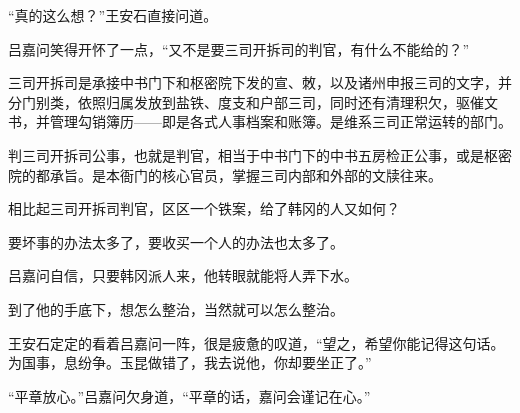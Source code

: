 “真的这么想？”王安石直接问道。

吕嘉问笑得开怀了一点，“又不是要三司开拆司的判官，有什么不能给的？”

三司开拆司是承接中书门下和枢密院下发的宣、敇，以及诸州申报三司的文字，并分门别类，依照归属发放到盐铁、度支和户部三司，同时还有清理积欠，驱催文书，并管理勾销簿历——即是各式人事档案和账簿。是维系三司正常运转的部门。

判三司开拆司公事，也就是判官，相当于中书门下的中书五房检正公事，或是枢密院的都承旨。是本衙门的核心官员，掌握三司内部和外部的文牍往来。

相比起三司开拆司判官，区区一个铁案，给了韩冈的人又如何？

要坏事的办法太多了，要收买一个人的办法也太多了。

吕嘉问自信，只要韩冈派人来，他转眼就能将人弄下水。

到了他的手底下，想怎么整治，当然就可以怎么整治。

王安石定定的看着吕嘉问一阵，很是疲惫的叹道，“望之，希望你能记得这句话。为国事，息纷争。玉昆做错了，我去说他，你却要坐正了。”

“平章放心。”吕嘉问欠身道，“平章的话，嘉问会谨记在心。”


